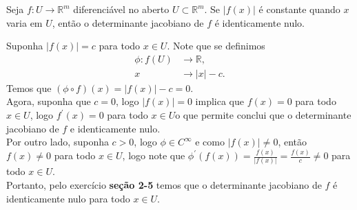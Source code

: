 \begin{homeworkProblem}[Seção 2-6]
  Seja $f : U \to \mathbb{R}^m$ diferenciável no aberto $U \subset \mathbb{R}^m$. Se $|f(x)|$ é constante quando $x$ varia em $U$, então o determinante jacobiano de $f$ é identicamente nulo.
  \begin{solution}
    Suponha $|f(x)|=c$ para todo $x\in U$. Note que se definimos
    \begin{align*}
      \phi:f(U)&\to\mathbb{R},\\
      x&\to|x|-c.
    \end{align*}
    Temos que $(\phi\circ f)(x)=|f(x)|-c=0$.\\
    
    Agora, suponha que $c=0$, logo $|f(x)|=0$ implica que $f(x)=0$ para todo $x\in U$, logo $f^{\prime}(x)=0$ para todo $x\in U$o que permite conclui que o determinante jacobiano de $f$ e identicamente nulo.\\
    
    Por outro lado, suponha $c>0$, logo $\phi\in C^{\infty}$ e como $|f(x)|\neq 0$, então $f(x)\neq 0$ para todo $x\in U$, logo note que $\phi^{\prime}(f(x))=\frac{f(x)}{|f(x)|}=\frac{f(x)}{c}\neq 0$ para todo $x\in U$.\\
    Portanto, pelo exercício \textbf{seção 2-5} temos que o determinante jacobiano de $f$ é identicamente nulo para todo $x\in U$. 
  \end{solution}
\end{homeworkProblem}
